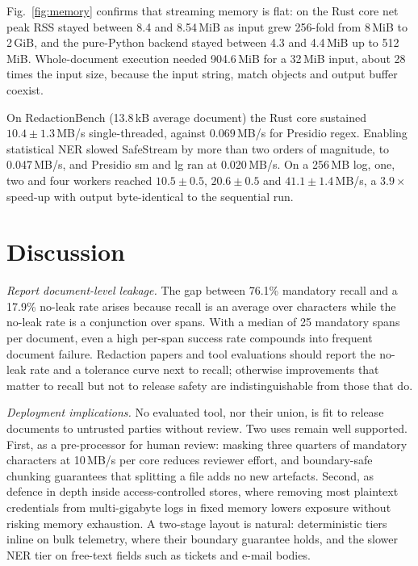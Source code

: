 \documentclass[conference]{IEEEtran}
\begin{document}
Fig.~\ref{fig:memory} confirms that streaming memory is flat: on the Rust core
net peak RSS stayed between 8.4 and 8.54\,MiB as input grew 256-fold from
8\,MiB to 2\,GiB, and the pure-Python backend stayed between 4.3 and 4.4\,MiB
up to 512\,MiB. Whole-document execution needed 904.6\,MiB for a 32\,MiB
input, about 28 times the input size, because the input string, match objects
and output buffer coexist.

On RedactionBench (13.8\,kB average document) the Rust core sustained
$10.4\pm1.3$\,MB/s single-threaded, against $0.069$\,MB/s for Presidio regex.
Enabling statistical NER slowed SafeStream by more than two orders of
magnitude, to 0.047\,MB/s, and Presidio sm and lg ran at 0.020\,MB/s.
On a 256\,MB log, one, two and four workers reached $10.5\pm0.5$,
$20.6\pm0.5$ and $41.1\pm1.4$\,MB/s, a $3.9\times$ speed-up with output
byte-identical to the sequential run.

\section{Discussion}

\textit{Report document-level leakage.} The gap between 76.1\% mandatory
recall and a 17.9\% no-leak rate arises because recall is an average over
characters while the no-leak rate is a conjunction over spans. With a median
of 25 mandatory spans per document, even a high per-span success rate
compounds into frequent document failure. Redaction papers and tool
evaluations should report the no-leak rate and a tolerance curve next to
recall; otherwise improvements that matter to recall but not to release safety
are indistinguishable from those that do.

\textit{Deployment implications.} No evaluated tool, nor their union, is fit to
release documents to untrusted parties without review. Two uses remain
well supported. First, as a pre-processor for human review: masking three
quarters of mandatory characters at 10\,MB/s per core reduces reviewer effort,
and boundary-safe chunking guarantees that splitting a file adds no new
artefacts. Second, as defence in depth inside access-controlled stores, where
removing most plaintext credentials from multi-gigabyte logs in fixed memory
lowers exposure without risking memory exhaustion. A two-stage layout is
natural: deterministic tiers inline on bulk telemetry, where their boundary
guarantee holds, and the slower NER tier on free-text fields such as tickets
and e-mail bodies.
\end{document}
